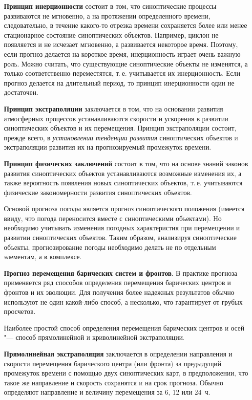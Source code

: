 \documentclass[a4paper, 12pt, twoside, final, book, russian, fittopage, cyremdash, openright]{ncc}
\begin{document}
\textbf{Принцип инерционности} состоит в
том, что синоптические процессы развиваются не мгновенно, а на
протяжении определенного времени, следовательно, в течение какого-то
отрезка времени сохраняется более или менее стационарное состояние
синоптических объектов. Например, циклон не появляется и не исчезает
мгновенно, а развивается некоторое время. Поэтому, если прогноз
делается на короткое время, инерционность играет очень важную
роль. Можно считать, что существующие синоптические объекты не
изменятся, а только соответственно переместятся, т.\,е. учитывается их
инерционность. Если прогноз делается на длительный период, то принцип
инерционности один не достаточен.

\textbf{Принцип экстраполяции}
заключается в том, что на основании развития атмосферных процессов
устанавливаются скорости и ускорения в развитии синоптических объектов
и их перемещения. Принцип экстраполяции состоит, прежде всего, в
\textit{установлении тенденции развития} синоптических объектов и
экстраполяции развития их на прогнозируемый промежуток времени.

\textbf{Принцип физических заключений} состоит в том, что на основе знаний законов развития
синоптических объектов устанавливаются возможные изменения их, а также
вероятность появления новых синоптических объектов, т.\,е. учитываются
физические закономерности развития синоптических объектов.

Основой прогноза погоды является прогноз синоптического положения
(имеется ввиду, что погода переносится вместе с синоптическими
объектами). Но необходимо учитывать изменения погодных характеристик
при перемещении и развитии синоптических объектов. Таким образом,
анализируя синоптические объекты, прогнозирование погоды необходимо
делать не по отдельным элементам, а в комплексе.

\textbf{Прогноз перемещения барических систем и фронтов}. В практике прогноза применяется ряд способов
определения перемещения барических центров и фронтов и их
эволюции. Для получения более надежных результатов обычно используют
не один какой-либо способ, а несколько, что гарантирует от грубых
просчетов.

Наиболее простой способ определения перемещения барических центров и
осей "--- способ прямолинейной и криволинейной экстраполяции.

\textbf{Прямолинейная экстраполяция}
заключается в определении направления и скорости перемещения
барического центра (или фронта) за предыдущий промежуток времени с
помощью двух синоптических карт, в предположении, что такое же
направление и скорость сохранятся и на срок прогноза. Обычно
определяют направление и величину перемещения за 6, 12 или 24~ч.
\end{document}
